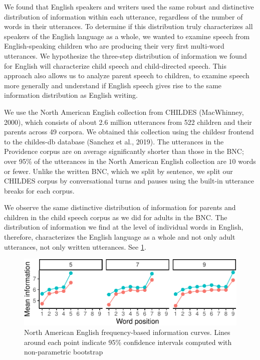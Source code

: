 \documentclass[man,floatsintext]{apa6}
\begin{document}
We found that English speakers and writers used the same robust and distinctive distribution of information within each utterance, regardless of the number of words in their utterances. To determine if this distribution truly characterizes all speakers of the English language as a whole, we wanted to examine speech from English-speaking children who are producing their very first multi-word utterances. We hypothesize the three-step distribution of information we found for English will characterize child speech and child-directed speech. This approach also allows us to analyze parent speech to children, to examine speech more generally and understand if English speech gives rise to the same information distribution as English writing.

We use the North American English collection from CHILDES (MacWhinney, 2000), which consists of about 2.6 million utterances from 522 children and their parents across 49 corpora. We obtained this collection using the childesr frontend to the childes-db database (Sanchez et al., 2019). The utterances in the Providence corpus are on average significantly shorter than those in the BNC; over 95\% of the utterances in the North American English collection are \(10\) words or fewer. Unlike the written BNC, which we split by sentence, we split our CHILDES corpus by conversational turns and pauses using the built-in utterance breaks for each corpus.

We observe the same distinctive distribution of information for parents and children in the child speech corpus as we did for adults in the BNC. The distribution of information we find at the level of individual words in English, therefore, characterizes the English language as a whole and not only adult utterances, not only written utterances. See \ref{fig:eng-unigrams}.

\begin{figure}
\centering
\includegraphics{figs/eng-unigrams-1.pdf}
\caption{\label{fig:eng-unigrams}North American English frequency-based information curves. Lines around each point indicate 95\% confidence intervals computed with non-parametric bootstrap}
\end{figure}
\end{document}
